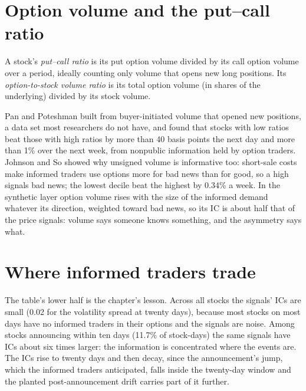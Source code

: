 \section{Option volume and the put--call ratio}

\begin{definition}\label{def:s1:options-implied-signals-for-stocks:volume}
A stock's \emph{put--call ratio} is its put option volume divided by its call option volume over a period, ideally counting only
volume that opens new long positions. Its \emph{option-to-stock volume ratio} is its total option volume (in shares of the
underlying) divided by its stock volume.
\end{definition}

Pan and Poteshman built  from buyer-initiated volume that opened new positions, a data set most researchers do not have, and found that
stocks with low ratios beat those with high ratios by more than 40 basis points the next day and more than 1\% over the next week, from nonpublic
information held by option traders. Johnson and So showed why unsigned volume is informative too: short-sale costs make informed traders use options more
for bad news than for good, so a high  signals bad news; the lowest decile beat the highest by 0.34\% a week. In the synthetic
layer option volume rises with the size of the informed demand whatever its direction, weighted toward bad news, so its IC is about half that of the price
signals: volume says someone knows something, and the asymmetry says what.

\section{Where informed traders trade}

The table's lower half is the chapter's lesson. Across all stocks the signals' ICs are small (0.02 for the volatility spread at twenty days), because most
stocks on most days have no informed traders in their options and the signals are noise. Among stocks announcing within ten days (11.7\% of stock-days) the
same signals have ICs about six times larger: the information is concentrated where the events are. The ICs rise to twenty days and then decay, since the
announcement's jump, which the informed traders anticipated, falls inside the twenty-day window and the planted post-announcement drift carries part of it
further.

